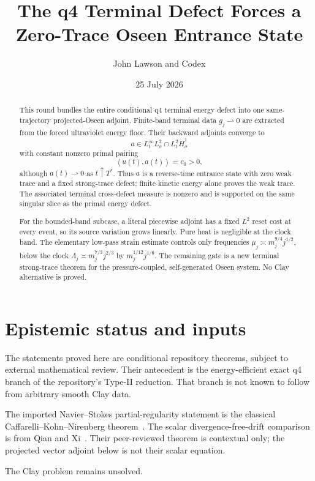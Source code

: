\documentclass[11pt]{article}
\title{The q4 Terminal Defect Forces a Zero-Trace Oseen Entrance State}
\author{John Lawson and Codex}
\date{25 July 2026}
\theoremstyle{remark}
\newcommand{\ip}[2]{\left\langle #1,#2\right\rangle}
\newcommand{\weakto}{\rightharpoonup}
\begin{document}
\maketitle

\begin{abstract}
This round bundles the entire conditional q4 terminal energy defect into
one same-trajectory projected-Oseen adjoint.  Finite-band terminal data
\(g_j\weakto0\) are extracted from the forced ultraviolet energy floor.
Their backward adjoints converge to
\[
 a\in L^\infty_tL^2_\sigma\cap L^2_t\dot H^1_\sigma
\]
with constant nonzero primal pairing
\[
 \ip{u(t)}{a(t)}=c_0>0,
\]
although \(a(t)\weakto0\) as \(t\uparrow T^*\).  Thus \(a\) is a
reverse-time entrance state with zero weak trace and a fixed strong-trace
defect; finite kinetic energy alone proves the weak trace.  The associated
terminal cross-defect measure is nonzero and is supported on the same
singular slice as the primal energy defect.

For the bounded-band subcase, a literal piecewise adjoint has a fixed
\(L^2\) reset cost at every event, so its source variation grows linearly.
Pure heat is negligible at the clock band.  The elementary low-pass strain
estimate controls only frequencies
\(\mu_j\asymp m_j^{9/4}j^{1/2}\), below the clock
\(\Lambda_j\asymp m_j^{7/3}j^{2/3}\) by
\(m_j^{1/12}j^{1/6}\).  The remaining gate is a new terminal
strong-trace theorem for the pressure-coupled, self-generated Oseen
system.  No Clay alternative is proved.
\end{abstract}

\section{Epistemic status and inputs}

The statements proved here are conditional repository theorems, subject
to external mathematical review.  Their antecedent is the
energy-efficient exact q4 branch of the repository's Type-II reduction.
That branch is not known to follow from arbitrary smooth Clay data.

The imported Navier--Stokes partial-regularity statement is the classical
Caffarelli--Kohn--Nirenberg theorem~\cite{CKN82}.  The scalar
divergence-free-drift comparison is from Qian and Xi~\cite{QX19}.
Their peer-reviewed theorem is contextual only; the projected vector
adjoint below is not their scalar equation.

The Clay problem remains unsolved.
\end{document}
